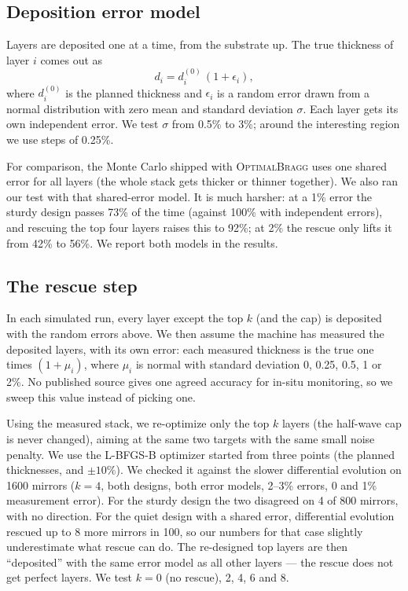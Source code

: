 \subsection{Deposition error model}

Layers are deposited one at a time, from the substrate up. The true
thickness of layer $i$ comes out as
\begin{equation}
d_i = d_i^{(0)}\,(1+\epsilon_i),
\end{equation}
where $d_i^{(0)}$ is the planned thickness and $\epsilon_i$ is a
random error drawn from a normal distribution with zero mean and
standard deviation $\sigma$. Each layer gets its own independent
error. We test $\sigma$ from 0.5\% to 3\%; around the interesting
region we use steps of 0.25\%.

For comparison, the Monte Carlo shipped with \textsc{OptimalBragg}
uses one shared error for all layers (the whole stack gets thicker or
thinner together). We also ran our test with that shared-error model.
It is much harsher: at a 1\% error the sturdy design passes 73\% of the
time (against 100\% with independent errors), and rescuing the top four
layers raises this to 92\%; at 2\% the rescue only lifts it from 42\% to
56\%. We report both models in the results.

\subsection{The rescue step}

In each simulated run, every layer except the top $k$ (and the cap) is
deposited with the random errors above. We then assume the machine has
measured the deposited layers, with its own error: each measured
thickness is the true one times $(1+\mu_i)$, where $\mu_i$ is normal
with standard deviation 0, 0.25, 0.5, 1 or 2\%. No published source
gives one agreed accuracy for in-situ monitoring, so we sweep this
value instead of picking one.

Using the measured stack, we re-optimize only the top $k$ layers
(the half-wave cap is never changed), aiming at the same two targets
with the same small noise penalty. We use the L-BFGS-B optimizer
started from three points (the planned thicknesses, and $\pm10\%$).
We checked it against the slower differential evolution on 1600
mirrors ($k=4$, both designs, both error models, 2--3\% errors, 0 and
1\% measurement error). For the sturdy design the two disagreed on 4 of
800 mirrors, with no direction. For the quiet design with a shared error,
differential evolution rescued up to 8 more mirrors in 100, so our
numbers for that case slightly underestimate what rescue can do. The re-designed
top layers are then ``deposited'' with the same error model as all
other layers --- the rescue does not get perfect layers. We test
$k = 0$ (no rescue), 2, 4, 6 and 8.

